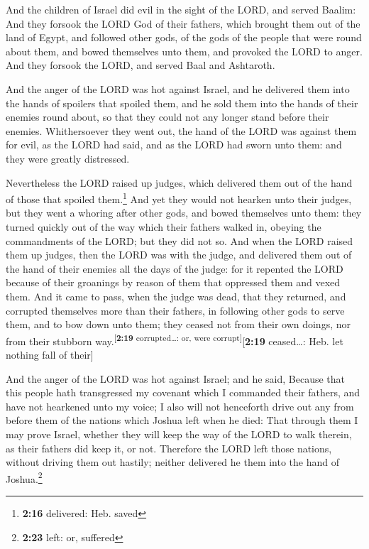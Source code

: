  And the children of Israel did evil in the sight of the
LORD, and served Baalim:  And they forsook the LORD God
of their fathers, which brought them out of the land of Egypt, and
followed other gods, of the gods of the people that were round about
them, and bowed themselves unto them, and provoked the LORD to anger.
 And they forsook the LORD, and served Baal and
Ashtaroth.

 And the anger of the LORD was hot against Israel, and he
delivered them into the hands of spoilers that spoiled them, and he sold
them into the hands of their enemies round about, so that they could not
any longer stand before their enemies.  Whithersoever
they went out, the hand of the LORD was against them for evil, as the
LORD had said, and as the LORD had sworn unto them: and they were
greatly distressed.

 Nevertheless the LORD raised up judges, which delivered
them out of the hand of those that spoiled them.\footnote{\textbf{2:16}
  delivered: Heb. saved}  And yet they would not hearken
unto their judges, but they went a whoring after other gods, and bowed
themselves unto them: they turned quickly out of the way which their
fathers walked in, obeying the commandments of the LORD; but they did
not so.  And when the LORD raised them up judges, then
the LORD was with the judge, and delivered them out of the hand of their
enemies all the days of the judge: for it repented the LORD because of
their groanings by reason of them that oppressed them and vexed them.
 And it came to pass, when the judge was dead, that they
returned, and corrupted themselves more than their fathers, in following
other gods to serve them, and to bow down unto them; they ceased not
from their own doings, nor from their stubborn
way.\textsuperscript{{[}\textbf{2:19} corrupted\ldots: or, were
corrupt{]}}{[}\textbf{2:19} ceased\ldots: Heb. let nothing fall of
their{]}

 And the anger of the LORD was hot against Israel; and he
said, Because that this people hath transgressed my covenant which I
commanded their fathers, and have not hearkened unto my voice;
 I also will not henceforth drive out any from before
them of the nations which Joshua left when he died:  That
through them I may prove Israel, whether they will keep the way of the
LORD to walk therein, as their fathers did keep it, or not.
 Therefore the LORD left those nations, without driving
them out hastily; neither delivered he them into the hand of
Joshua.\footnote{\textbf{2:23} left: or, suffered}

